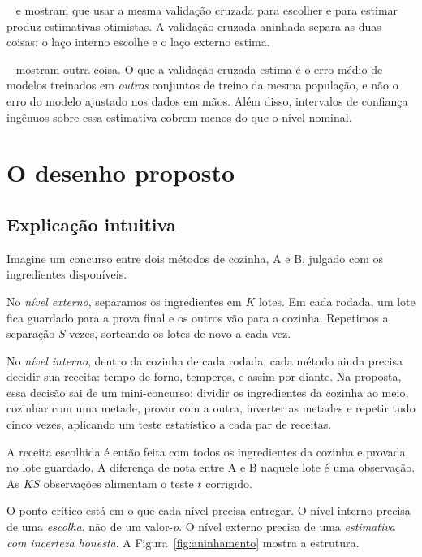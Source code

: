 \documentclass[11pt,a4paper]{article}
\newcommand{\etiqueta}[2]{\tcbox[on line, colback=#1!10, colframe=#1!75!black,
  boxrule=0.4pt, arc=1.2pt, left=1.5pt, right=1.5pt, top=0pt, bottom=0pt,
  fontupper=\sffamily\scriptsize\bfseries]{#2}}
\newcommand{\lit}{\etiqueta{oiBlue}{Literatura}}
\begin{document}
\lit\ \citet{varma2006} e \citet{cawley2010} mostram que usar a mesma validação cruzada para escolher e para estimar produz estimativas otimistas. A validação cruzada aninhada separa as duas coisas: o laço interno escolhe e o laço externo estima.

\lit\ \citet{bates2024} mostram outra coisa. O que a validação cruzada estima é o erro médio de modelos treinados em \emph{outros} conjuntos de treino da mesma população, e não o erro do modelo ajustado nos dados em mãos. Além disso, intervalos de confiança ingênuos sobre essa estimativa cobrem menos do que o nível nominal.

\section{O desenho proposto}
\label{sec:desenho}

\subsection{Explicação intuitiva}

Imagine um concurso entre dois métodos de cozinha, A e B, julgado com os ingredientes disponíveis.

No \emph{nível externo}, separamos os ingredientes em $K$ lotes. Em cada rodada, um lote fica guardado para a prova final e os outros vão para a cozinha. Repetimos a separação $S$ vezes, sorteando os lotes de novo a cada vez.

No \emph{nível interno}, dentro da cozinha de cada rodada, cada método ainda precisa decidir sua receita: tempo de forno, temperos, e assim por diante. Na proposta, essa decisão sai de um mini-concurso: dividir os ingredientes da cozinha ao meio, cozinhar com uma metade, provar com a outra, inverter as metades e repetir tudo cinco vezes, aplicando um teste estatístico a cada par de receitas.

A receita escolhida é então feita com todos os ingredientes da cozinha e provada no lote guardado. A diferença de nota entre A e B naquele lote é uma observação. As $KS$ observações alimentam o teste $t$ corrigido.

O ponto crítico está em o que cada nível precisa entregar. O nível interno precisa de uma \emph{escolha}, não de um valor-$p$. O nível externo precisa de uma \emph{estimativa com incerteza honesta}. A Figura~\ref{fig:aninhamento} mostra a estrutura.
\end{document}
